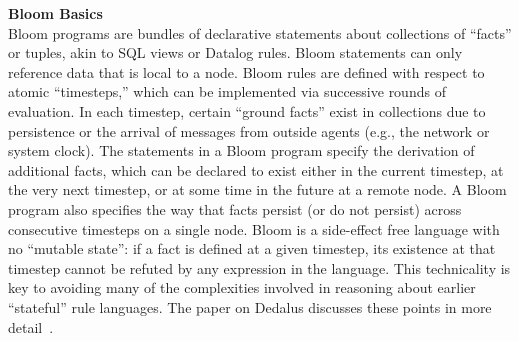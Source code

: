 \noindent\textbf{Bloom Basics}\\
\noindent
Bloom programs are bundles of declarative statements about collections of ``facts'' or tuples, akin to SQL views or Datalog rules.  Bloom statements can only reference data that is local to a node.  Bloom rules are defined with respect to atomic ``timesteps,'' which can be implemented via successive rounds of evaluation. In each timestep, certain ``ground facts'' exist in collections due to persistence or the arrival of messages from outside agents (e.g., the network or system clock).  The statements in a Bloom program specify the derivation of additional facts, which can be declared to exist either in the current timestep, at the very next timestep, or at some time in the future at a remote node.  A Bloom program also specifies the way that facts persist (or do not persist) across consecutive timesteps on a single node.  Bloom is a side-effect free language with no ``mutable state'': if a fact is defined at a given timestep, its existence at that timestep cannot be refuted by any expression in the language.  This technicality is key to avoiding many of the complexities involved in reasoning about earlier ``stateful'' rule languages.  The paper on Dedalus discusses these points in more detail~\cite{dedalus-techr}.

